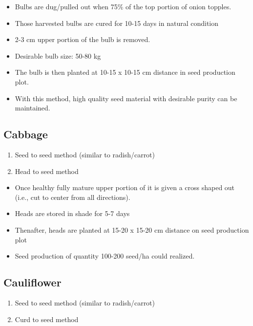 \documentclass[
  openany]{book}
\providecommand{\tightlist}{%
  \setlength{\itemsep}{0pt}\setlength{\parskip}{0pt}}
\begin{document}
\begin{itemize}
\tightlist
\item
  Bulbs are dug/pulled out when 75\% of the top portion of onion topples.
\item
  Those harvested bulbs are cured for 10-15 days in natural condition
\item
  2-3 cm upper portion of the bulb is removed.
\item
  Desirable bulb size: 50-80 kg
\item
  The bulb is then planted at 10-15 x 10-15 cm distance in seed production plot.
\item
  With this method, high quality seed material with desirable purity can be maintained.
\end{itemize}

\hypertarget{cabbage}{%
\subsection{Cabbage}\label{cabbage}}

\begin{enumerate}
\def\labelenumi{\arabic{enumi}.}
\tightlist
\item
  Seed to seed method (similar to radish/carrot)
\item
  Head to seed method
\end{enumerate}

\begin{itemize}
\tightlist
\item
  Once healthy fully mature upper portion of it is given a cross shaped out (i.e., cut to center from all directions).
\item
  Heads are stored in shade for 5-7 days
\item
  Thenafter, heads are planted at 15-20 x 15-20 cm distance on seed production plot
\item
  Seed production of quantity 100-200 seed/ha could realized.
\end{itemize}

\hypertarget{cauliflower}{%
\subsection{Cauliflower}\label{cauliflower}}

\begin{enumerate}
\def\labelenumi{\arabic{enumi}.}
\tightlist
\item
  Seed to seed method (similar to radish/carrot)
\item
  Curd to seed method
\end{enumerate}
\end{document}
